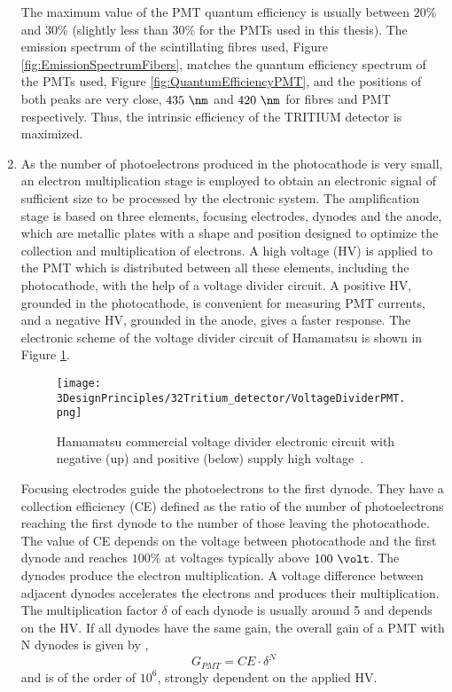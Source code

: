 \begin{enumerate}
The maximum value of the PMT quantum efficiency is usually between $20\%$ and $30\%$ \cite{Knoll} (slightly less than $30\%$ for the PMTs used in this thesis). The emission spectrum of the scintillating fibres used, Figure \ref{fig:EmissionSpectrumFibers}, matches the quantum efficiency spectrum of the PMTs used, Figure \ref{fig:QuantumEfficiencyPMT}, and the positions of both peaks are very close, $435~\nm$ and $420~\nm$ for fibres and PMT respectively. Thus, the intrinsic efficiency of the TRITIUM detector is maximized.

\item{} As the number of photoelectrons produced in the photocathode is very small, an electron multiplication stage is employed to obtain an electronic signal of sufficient size to be processed by the electronic system. The amplification stage is based on three elements, focusing electrodes, dynodes and the anode, which are metallic plates with a shape and position designed to optimize the collection and multiplication of electrons. A high voltage (HV) is applied to the PMT which is distributed between all these elements, including the photocathode, with the help of a voltage divider circuit. A positive HV, grounded in the photocathode, is convenient for measuring PMT currents, and a negative HV, grounded in the anode, gives a faster response. The electronic scheme of the voltage divider circuit of Hamamatsu is shown in Figure \ref{fig:VoltageDividerCircuit}.

\begin{figure}[h]
\centering
\texttt{[image: 3DesignPrinciples/32Tritium\_detector/VoltageDividerPMT.png]}
\caption{Hamamatsu commercial voltage divider electronic circuit with negative (up) and positive (below) supply high voltage\label{fig:VoltageDividerCircuit}~\cite{DataSheetPMTs}.}
\end{figure}


Focusing electrodes guide the photoelectrons to the first dynode. They have a collection efficiency (CE) defined as the ratio of the number of photoelectrons reaching the first dynode to the number of those leaving the photocathode. The value of CE depends on the voltage between photocathode and the first dynode and reaches $100\%$ at voltages typically above $100~\volt$. The dynodes produce the electron multiplication. A voltage difference between adjacent dynodes accelerates the electrons and produces their multiplication. The multiplication factor $\delta$ of each dynode is usually around 5 and depends on the HV. If all dynodes have the same gain, the overall gain of a PMT with N dynodes is given by \cite{Knoll},
\begin{equation}
G_{PMT} = CE\cdot{} \delta^N
\label{eq:PMTGain}
\end{equation}
and is of the order of $10^6$, strongly dependent on the applied HV.


\end{enumerate}
